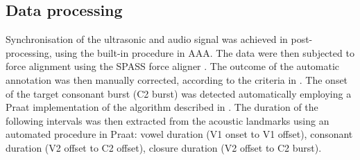 \documentclass[authoryear, twocolumn]{elsarticle}
\begin{document}
\subsection{Data processing}\label{data-processing}

Synchronisation of the ultrasonic and audio signal was achieved in
post-processing, using the built-in procedure in AAA. The data were then
subjected to force alignment using the SPASS force aligner
\citep{bigi2015}. The outcome of the automatic annotation was then
manually corrected, according to the criteria in .
The onset of the target consonant burst (C2 burst) was detected
automatically employing a Praat implementation of the algorithm
described in \citet{ananthapadmanabha2014}. The duration of the
following intervals was then extracted from the acoustic landmarks using
an automated procedure in Praat: vowel duration (V1 onset to V1 offset),
consonant duration (V2 offset to C2 offset), closure duration (V2 offset
to C2 burst).

\end{document}
